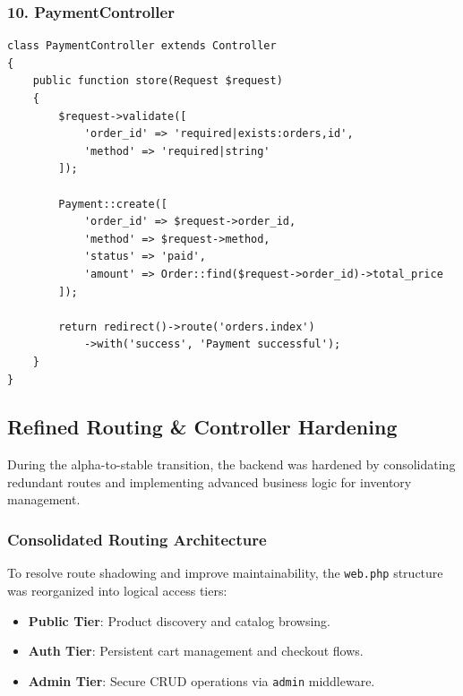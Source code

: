 \documentclass[12pt,a4paper]{article}
\begin{document}
\subsubsection{10. PaymentController}

\begin{verbatim}
class PaymentController extends Controller
{
    public function store(Request $request)
    {
        $request->validate([
            'order_id' => 'required|exists:orders,id',
            'method' => 'required|string'
        ]);

        Payment::create([
            'order_id' => $request->order_id,
            'method' => $request->method,
            'status' => 'paid',
            'amount' => Order::find($request->order_id)->total_price
        ]);

        return redirect()->route('orders.index')
            ->with('success', 'Payment successful');
    }
}
\end{verbatim}


\subsection{Refined Routing \& Controller Hardening}

During the alpha-to-stable transition, the backend was hardened by consolidating redundant routes and implementing advanced business logic for inventory management.

\subsubsection{Consolidated Routing Architecture}

To resolve route shadowing and improve maintainability, the \texttt{web.php} structure was reorganized into logical access tiers:

\begin{itemize}
    \item \textbf{Public Tier}: Product discovery and catalog browsing.
    \item \textbf{Auth Tier}: Persistent cart management and checkout flows.
    \item \textbf{Admin Tier}: Secure CRUD operations via \texttt{admin} middleware.
\end{itemize}
\end{document}
